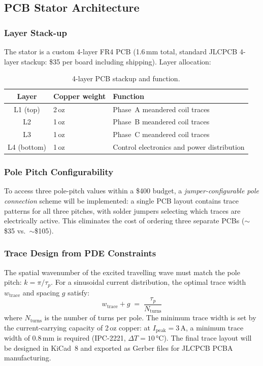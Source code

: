 \documentclass[12pt,letterpaper]{article}
\begin{document}
\subsection{PCB Stator Architecture}

\subsubsection{Layer Stack-up}

The stator is a custom 4-layer FR4 PCB (1.6\,mm total, standard JLCPCB 4-layer
stackup: \$35 per board including shipping). Layer allocation:

\begin{table}[H]
\centering
\caption{4-layer PCB stackup and function.}
\label{tab:pcb}
\begin{tabular}{cll}
\toprule
\textbf{Layer} & \textbf{Copper weight} & \textbf{Function} \\
\midrule
L1 (top)    & 2\,oz & Phase~A meandered coil traces \\
L2          & 1\,oz & Phase~B meandered coil traces \\
L3          & 1\,oz & Phase~C meandered coil traces \\
L4 (bottom) & 1\,oz & Control electronics and power distribution \\
\bottomrule
\end{tabular}
\end{table}

\subsubsection{Pole Pitch Configurability}

To access three pole-pitch values within a \$400 budget, a \emph{jumper-configurable
pole connection} scheme will be implemented: a single PCB layout contains trace
patterns for all three pitches, with solder jumpers selecting which traces are
electrically active. This eliminates the cost of ordering three separate PCBs
($\sim$\$35 vs.\ $\sim$\$105).

\subsubsection{Trace Design from PDE Constraints}

The spatial wavenumber of the excited travelling wave must match the pole pitch:
$k = \pi/\tau_p$. For a sinusoidal current distribution, the optimal trace width
$w_{\mathrm{trace}}$ and spacing $g$ satisfy:
\begin{equation}
  w_{\mathrm{trace}} + g \;=\; \frac{\tau_p}{N_{\mathrm{turns}}}
  \label{eq:trace_design}
\end{equation}
where $N_{\mathrm{turns}}$ is the number of turns per pole. The minimum trace width is
set by the current-carrying capacity of 2\,oz copper: at $I_{\mathrm{peak}} = 3$\,A,
a minimum trace width of 0.8\,mm is required (IPC-2221, $\Delta T = 10$\,°C).
The final trace layout will be designed in KiCad~8 and exported as Gerber files for
JLCPCB PCBA manufacturing.
\end{document}
